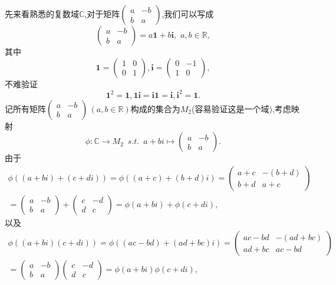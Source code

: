 \documentclass[10pt,a4paper]{ctexbook}
\theoremstyle{definition}
\begin{document}
先来看熟悉的复数域$\mathbb{C}$,对于矩阵$\begin{pmatrix}
    a & -b \\ b & a
\end{pmatrix}$,我们可以写成
\[
    \begin{pmatrix}
        a & -b \\ b & a
    \end{pmatrix} = a\mathbf{1}+b\mathbf{i},\,\,a,b\in\mathbb{R},
\]
其中
\[
    \mathbf{1}=\begin{pmatrix}
        1 & 0 \\ 0 & 1
    \end{pmatrix},\mathbf{i}=\begin{pmatrix}
        0 & -1 \\ 1 & 0
    \end{pmatrix},
\]
不难验证
\[
    \mathbf{1}^2=\mathbf{1},\mathbf{1}\mathbf{i}=\mathbf{i}\mathbf{1}=\mathbf{i},\mathbf{i}^2=\mathbf{1}.
\]
记所有矩阵$\begin{pmatrix}
    a & -b \\ b & a
\end{pmatrix}\,(a,b\in\mathbb{R})$构成的集合为$M_2$(容易验证这是一个域),考虑映射
\[
    \phi:\mathbb{C}\to M_2\,\,\, s.t. \,\,\, a+bi\mapsto \begin{pmatrix}
        a & -b \\ b & a
    \end{pmatrix}.
\]
由于
\begin{gather*}
    \phi((a+bi)+(c+di))=\phi((a+c)+(b+d)i)=\begin{pmatrix}
        a+c & -(b+d) \\ b+d & a+c
    \end{pmatrix}\\=\begin{pmatrix}
        a & -b \\ b & a
    \end{pmatrix} + \begin{pmatrix}
        c & -d \\ d & c
    \end{pmatrix}=\phi(a+bi)+\phi(c+di),
\end{gather*}
以及
\begin{gather*}
    \phi((a+bi)(c+di))=\phi((ac-bd)+(ad+bc)i)=\begin{pmatrix}
        ac-bd & -(ad+bc) \\ ad+bc & ac-bd
    \end{pmatrix}\\=\begin{pmatrix}
        a & -b \\ b & a
    \end{pmatrix}\begin{pmatrix}
        c & -d \\ d & c
    \end{pmatrix}=\phi(a+bi)\phi(c+di),
\end{gather*}
\end{document}
